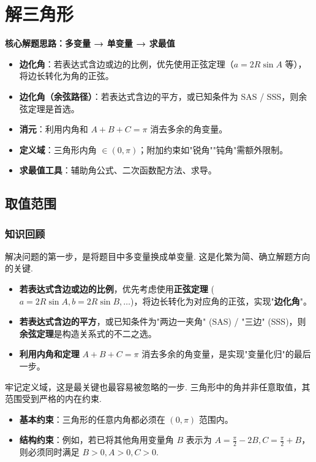 \chapter{解三角形}
\setcounter{choicecounter}{0}

\begin{knowledgeframe}
\textbf{核心解题思路：多变量 → 单变量 → 求最值}
\begin{itemize}
	\item \textbf{边化角}：若表达式含边或边的比例，优先使用正弦定理（$a=2R\sin A$ 等），将边长转化为角的正弦。
	\item \textbf{边化角（余弦路径）}：若表达式含边的平方，或已知条件为 SAS / SSS，则余弦定理是首选。
	\item \textbf{消元}：利用内角和 $A+B+C=\pi$ 消去多余的角变量。
	\item \textbf{定义域}：三角形内角 $\in (0, \pi)$；附加约束如"锐角""钝角"需额外限制。
	\item \textbf{求最值工具}：辅助角公式、二次函数配方法、求导。
\end{itemize}
\end{knowledgeframe}

\section{取值范围}

\subsection*{知识回顾}

解决问题的第一步，是将题目中多变量换成单变量. 这是化繁为简、确立解题方向的关键.
\begin{itemize}
	\item \textbf{若表达式含边或边的比例}，优先考虑使用\textbf{正弦定理} ($a=2R\sin A, b=2R\sin B, \dots$)，将边长转化为对应角的正弦，实现"\textbf{边化角}"。
	\item \textbf{若表达式含边的平方}，或已知条件为"两边一夹角" (SAS) / "三边" (SSS)，则\textbf{余弦定理}是构造关系式的不二之选。
	\item \textbf{利用内角和定理} $A+B+C=\pi$ 消去多余的角变量，是实现"变量化归"的最后一步。
\end{itemize}

牢记定义域，这是最关键也最容易被忽略的一步. 三角形中的角并非任意取值，其范围受到严格的内在约束.
\begin{itemize}
	\item \textbf{基本约束}：三角形的任意内角都必须在 $(0, \pi)$ 范围内。
	\item \textbf{结构约束}：例如，若已将其他角用变量角 $B$ 表示为 $A=\frac{\pi}{2}-2B, C=\frac{\pi}{2}+B$，则必须同时满足 $B>0, A>0, C>0$.
\end{itemize}

